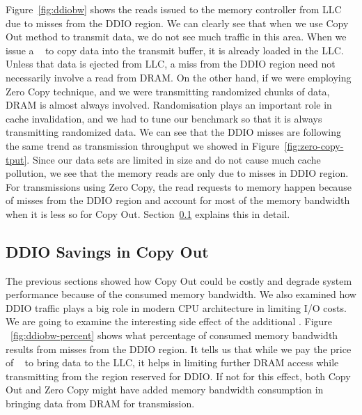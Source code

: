 Figure~\ref{fig:ddiobw} shows the reads issued to the memory controller from LLC due to misses from the  DDIO region. We can clearly see that when we use Copy Out 
method to transmit data, we do not see much traffic in this area. When we issue a \memcpy~ to copy data into the transmit buffer, it is already loaded in the LLC. 
Unless that data is ejected from LLC, a miss from the DDIO region need not necessarily involve a read from DRAM. On the other hand, if we were employing Zero Copy technique, 
and we were transmitting randomized chunks of data, DRAM is almost always involved. Randomisation plays an important role in cache invalidation,
 and we had to tune our benchmark so that it is always transmitting randomized data. 
We can see that the DDIO misses are following the same trend as transmission throughput we showed in Figure~\ref{fig:zero-copy-tput}. 
Since our data sets are limited in size and do not cause much cache pollution, we see that the 
memory reads are only due to misses in DDIO region. For transmissions using Zero Copy, 
the read requests to memory happen because of misses from the DDIO region and account for 
most of the memory bandwidth when it is less so for Copy Out. Section~\ref{sec:ddiobw-savings} explains this in detail.
\newline



\subsection{DDIO Savings in Copy Out}
\label{sec:ddiobw-savings}
The previous sections showed how Copy Out could be costly and degrade system performance 
because of the consumed memory bandwidth. We also examined how DDIO traffic plays a big role 
in modern CPU architecture in limiting I/O costs. We are going to examine the 
interesting side effect of the additional \memcpy. Figure ~\ref{fig:ddiobw-percent} shows what percentage of consumed 
memory bandwidth results from misses from the DDIO region. It tells us that while 
we pay the price of \memcpy~ to bring data to the LLC, it helps in limiting further DRAM access while transmitting 
from the region reserved for DDIO. If not for this effect, both Copy Out and Zero Copy 
might have added memory bandwidth consumption in bringing data from DRAM for transmission. 



